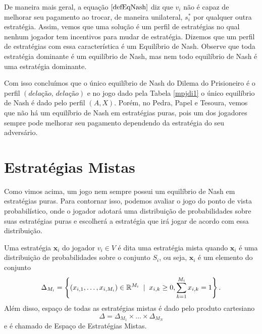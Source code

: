 De maneira mais geral, a equação $\eqref{defEqNash}$ diz que $v_i$ não é capaz de melhorar seu pagamento ao trocar, de maneira unilateral, $s^*_i$ por qualquer outra estratégia. Assim, vemos que uma solução é um perfil de estratégias no qual nenhum jogador tem incentivos para mudar de estratégia. Dizemos que um perfil de estratégias com essa característica é um Equilíbrio de Nash. Observe que toda estratégia dominante é um equilíbrio de Nash, mas nem todo equilíbrio de Nash é uma estratégia dominante.

Com isso concluímos que o único equilíbrio de Nash do Dilema do Prisioneiro é o perfil $(\textit{delação, delação})$ e no jogo dado pela Tabela \ref{mpjdi1} o único equilíbrio de Nash é dado pelo perfil $(A,X)$. Porém, no Pedra, Papel e Tesoura, vemos que não há um equilíbrio de Nash em estratégias puras, pois um dos jogadores sempre pode melhorar seu pagamento dependendo da estratégia do seu adversário.


\section{Estratégias Mistas}

Como vimos acima, um jogo nem sempre possui um equilíbrio de Nash em estratégias puras. Para contornar isso, podemos avaliar o jogo do ponto de vista probabilístico, onde o jogador adotará uma distribuição de probabilidades sobre suas estratégias puras e escolherá a estratégia que irá jogar de acordo com essa distribuição. 

\begin{definition}
\label{eqn}
    Uma estratégia $\boldsymbol{x}_i$ do jogador $v_i\in V$ é dita uma estratégia mista quando $\boldsymbol{x}_i$ é uma distribuição de probabilidades sobre o conjunto $S_i$, ou seja, $\boldsymbol{x}_i$ é um elemento do conjunto
    \begin{equation}
        \Delta_{M_i}=\left\{(x_{i,1},\dots,x_{i,M_i})\in\mathbb{R}^{M_i}\;\mid\;  x_{i,k}\geq 0, \sum_{k=1}^{M_i} x_{i,k}=1\right\}.
    \end{equation}
    Além disso, espaço de todas as estratégias mistas é dado pelo produto cartesiano
    \begin{equation}
        \label{defDelta}
        \Delta=\Delta_{M_1}\times\dots\times\Delta_{M_N}
    \end{equation}
    e é chamado de Espaço de Estratégias Mistas.
\end{definition}

